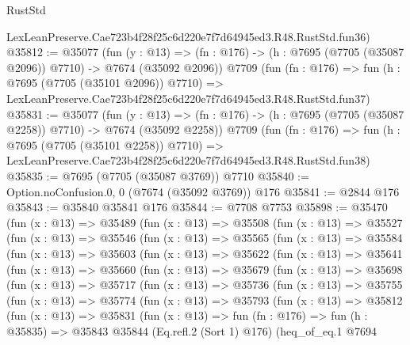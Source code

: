 \begin{lexlean}{RustStd}
\begin{coremodule}
    LexLeanPreserve.Cae723b4f28f25c6d220e7f7d64945ed3.R48.RustStd.fun36)
@35812 := @35077
    (fun (y : @13) =>
    (fn : @176) -> (h : @7695 (@7705 (@35087 @2096)) @7710) -> @7674 (@35092 @2096))
    @7709
    (fun (fn : @176) =>
    fun (h : @7695 (@7705 (@35101 @2096)) @7710) =>
    LexLeanPreserve.Cae723b4f28f25c6d220e7f7d64945ed3.R48.RustStd.fun37)
@35831 := @35077
    (fun (y : @13) =>
    (fn : @176) -> (h : @7695 (@7705 (@35087 @2258)) @7710) -> @7674 (@35092 @2258))
    @7709
    (fun (fn : @176) =>
    fun (h : @7695 (@7705 (@35101 @2258)) @7710) =>
    LexLeanPreserve.Cae723b4f28f25c6d220e7f7d64945ed3.R48.RustStd.fun38)
@35835 := @7695 (@7705 (@35087 @3769)) @7710
@35840 := Option.noConfusion.{0, 0} (@7674 (@35092 @3769)) @176
@35841 := @2844 @176
@35843 := @35840 @35841 @176
@35844 := @7708 @7753
@35898 := @35470
    (fun (x : @13) =>
    @35489
      (fun (x : @13) =>
      @35508
        (fun (x : @13) =>
        @35527
          (fun (x : @13) =>
          @35546
            (fun (x : @13) =>
            @35565
              (fun (x : @13) =>
              @35584
                (fun (x : @13) =>
                @35603
                  (fun (x : @13) =>
                  @35622
                    (fun (x : @13) =>
                    @35641
                      (fun (x : @13) =>
                      @35660
                        (fun (x : @13) =>
                        @35679
                          (fun (x : @13) =>
                          @35698
                            (fun (x : @13) =>
                            @35717
                              (fun (x : @13) =>
                              @35736
                                (fun (x : @13) =>
                                @35755
                                  (fun (x : @13) =>
                                  @35774
                                    (fun (x : @13) =>
                                    @35793
                                      (fun (x : @13) =>
                                      @35812
                                        (fun (x : @13) =>
                                        @35831
                                          (fun (x : @13) =>
                                          fun (fn : @176) =>
                                          fun (h : @35835) =>
                                          @35843
                                            @35844
                                            (Eq.refl.{2} (Sort 1) @176)
                                            (heq_of_eq.{1}
                                              @7694

\end{coremodule}
\end{lexlean}
